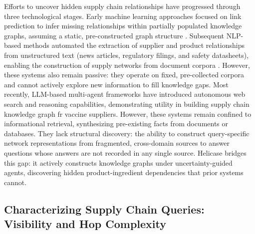 \documentclass{article}
\begin{document}
Efforts to uncover hidden supply chain relationships have progressed through three technological stages. Early machine learning approaches focused on link prediction to infer missing relationships within partially populated knowledge graphs, assuming a static, pre-constructed graph structure \citep{brintrup2018predicting, kosasih2025towards}. Subsequent NLP-based methods automated the extraction of supplier and product relationships from unstructured text (news articles, regulatory filings, and safety datasheets), enabling the construction of supply networks from document corpora \citep{wichmann2020extracting}. However, these systems also remain passive: they operate on fixed, pre-collected corpora and cannot actively explore new information to fill knowledge gaps.
Most recently, LLM-based multi-agent frameworks have introduced autonomous web search and reasoning capabilities, demonstrating utility in building supply chain knowledge graph fr vaccine suppliers\citep{zheng2025enhancing}. However, these systems remain confined to informational retrieval, synthesizing pre-existing facts from documents or databases. They lack structural discovery: the ability to construct query-specific network representations from fragmented, cross-domain sources to answer questions whose answers are not recorded in any single source.
Helicase bridges this gap: it actively constructs knowledge graphs under uncertainty-guided agents, discovering hidden product-ingredient dependencies that prior systems cannot.


\subsection{Characterizing Supply Chain Queries: Visibility and Hop Complexity}

\label{related:2}
\end{document}
